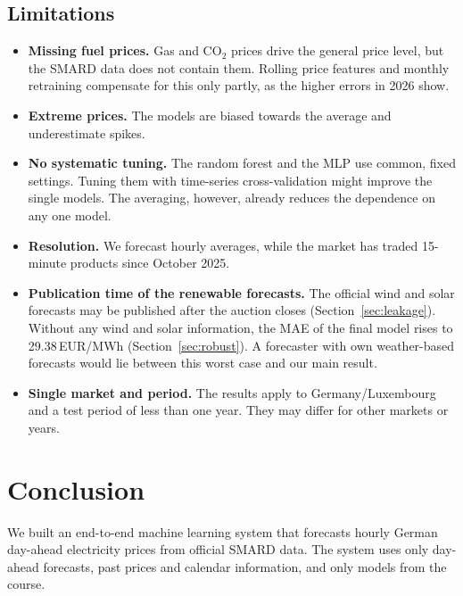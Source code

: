 \documentclass[12pt,oneside]{article}
\begin{document}
\subsection{Limitations} \label{sec:limitations}

\begin{itemize}
    \item \textbf{Missing fuel prices.} Gas and CO$_2$ prices drive the general price level, but the SMARD data does not contain them. Rolling price features and monthly retraining compensate for this only partly, as the higher errors in 2026 show.
    \item \textbf{Extreme prices.} The models are biased towards the average and underestimate spikes.
    \item \textbf{No systematic tuning.} The random forest and the MLP use common, fixed settings. Tuning them with time-series cross-validation might improve the single models. The averaging, however, already reduces the dependence on any one model.
    \item \textbf{Resolution.} We forecast hourly averages, while the market has traded 15-minute products since October 2025.
    \item \textbf{Publication time of the renewable forecasts.} The official wind and solar forecasts may be published after the auction closes (Section~\ref{sec:leakage}). Without any wind and solar information, the MAE of the final model rises to 29.38\,EUR/MWh (Section~\ref{sec:robust}). A forecaster with own weather-based forecasts would lie between this worst case and our main result.
    \item \textbf{Single market and period.} The results apply to Germany/Luxembourg and a test period of less than one year. They may differ for other markets or years.
\end{itemize}

\section{Conclusion} \label{sec:conclusion}

We built an end-to-end machine learning system that forecasts hourly German day-ahead electricity prices from official SMARD data. The system uses only day-ahead forecasts, past prices and calendar information, and only models from the course.
\end{document}
